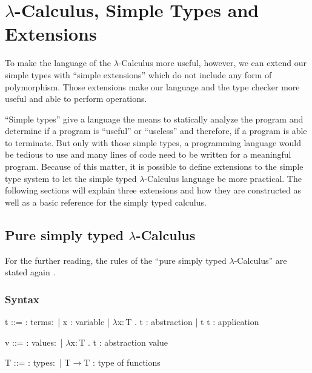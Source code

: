 \section{$\lambda$-Calculus, Simple Types and Extensions}

To make the language of the $\lambda$-Calculus more useful, however, we can extend
our simple types with ``simple extensions'' which do not include any
form of polymorphism. Those extensions make our language and the type
checker more useful and able to perform operations.

``Simple types'' give a language the means to statically analyze the program
and determine if a program is ``useful'' or ``useless'' and therefore, if a
program is able to terminate. But only with those simple types, a programming
language would be tedious to use and many lines of code need to be written
for a meaningful program. Because of this matter, it is possible to define
extensions to the simple type system to let the simple typed $\lambda$-Calculus
language be more practical. The following sections will explain three
extensions and how they are constructed as well as a basic reference for the
simply typed calculus.

\subsection{Pure simply typed $\lambda$-Calculus}

For the further reading, the rules of the ``pure simply typed $\lambda$-Calculus''
are stated again \cite{pierce2002ProgLang}.

\subsubsection{Syntax}
\begin{bnfgrammar}
    t ::= : terms$\colon$
    | x : variable
    | $\lambda$x$\colon$T . t : abstraction
    | t t : application
\end{bnfgrammar}\leavevmode\newline

\begin{bnfgrammar}
    v ::= : values$\colon$
    | $\lambda$x$\colon$T . t : abstraction value
\end{bnfgrammar}\leavevmode\newline

\begin{bnfgrammar}
    T ::= : types$\colon$
    | T$\rightarrow$T : type of functions
\end{bnfgrammar}\leavevmode\newline


